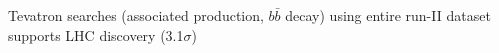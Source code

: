 
Tevatron searches (associated production, $b\bar{b}$ decay) using entire run-II dataset supports LHC discovery (3.1$\sigma$) \cite{Tevatron:2012}
